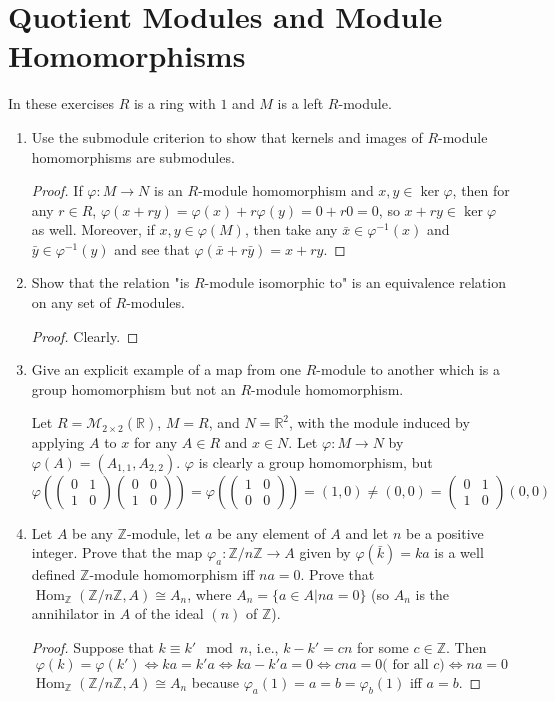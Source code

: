 \documentclass{report}
\newcommand{\Z}{\mathbb{Z}}
\newcommand{\R}{\mathbb{R}}
\DeclareMathOperator{\Hom}{Hom}
\begin{document}
\section{Quotient Modules and Module Homomorphisms}
In these exercises $R$ is a ring with $1$ and $M$ is a left $R$-module.
\begin{enumerate} 
	\item  Use the submodule criterion to show that kernels and images of $R$-module homomorphisms are submodules.
		\begin{proof}
			If $\varphi:M\to N$ is an $R$-module homomorphism and $x,y\in\ker\varphi$, then for any $r\in R$, 
			$\varphi(x+ry)=\varphi(x)+r\varphi(y)=0+r0=0$, so $x+ry\in\ker\varphi$ as well. 
			Moreover, if $x,y\in \varphi(M)$, then take any $\bar{x}\in\varphi^{-1}(x)$ and $\bar{y}\in\varphi^{-1}(y)$ and see that $\varphi(\bar{x}+r\bar{y})=x+ry$.
		\end{proof}
	\item Show that the relation "is $R$-module isomorphic to" is an equivalence relation on any set of $R$-modules.
		\begin{proof}
			Clearly. 
		\end{proof}
		
	\item Give an explicit example of a map from one $R$-module to another which is a group homomorphism but not an $R$-module homomorphism.
		\newline
	
		Let $R=\mathcal{M}_{2\times 2}(\R)$, $M=R$, and $N=\R^2$, with the module induced by applying $A$ to $x$ for any $A\in R$ and $x\in N$.
		Let $\varphi:M\to N$ by $\varphi(A)=(A_{1,1},A_{2,2})$. $\varphi$ is clearly a group homomorphism, but 
		$$\varphi\left(\begin{pmatrix}0&1\\1&0\end{pmatrix}\begin{pmatrix}0&0\\1&0\end{pmatrix}\right)=
		\varphi\left(\begin{pmatrix}1&0\\0&0\end{pmatrix}\right)=(1,0)
		\neq(0,0)=\begin{pmatrix}0&1\\1&0\end{pmatrix}(0,0)$$	
	\item Let $A$ be any $\Z$-module, let $a$ be any element of $A$ and let $n$ be a positive integer.
		Prove that the map $\varphi_a:\Z /n\Z\to A$ given by $\varphi(\bar{k})=ka$ is a well defined $\Z$-module homomorphism iff $na=0$.
		Prove that $\Hom_\Z(\Z /n\Z,A)\cong A_n$, where $A_n=\{a\in A|na=0\}$ (so $A_n$ is the annihilator in $A$ of the ideal $(n)$ of $\Z$).
		\begin{proof}
			Suppose that $k\equiv k' \mod n$, i.e., $k-k'=cn$ for some $c\in\Z$. Then
			$$\varphi(k)=\varphi(k')\iff ka=k'a \iff ka-k'a=0\iff cna=0 \text{( for all $c$)}\iff na=0 $$
			$\Hom_\Z(\Z /n\Z,A)\cong A_n$ because $\varphi_a(1)=a=b=\varphi_b(1)$ iff $a=b$. 
		\end{proof}
		

\end{enumerate}
\end{document}
